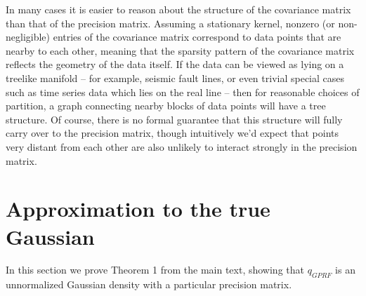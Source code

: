 \documentclass{article}
\begin{document}
In many cases it is easier to reason about the structure of the covariance matrix than that of the precision matrix. Assuming a stationary kernel, nonzero (or non-negligible) entries of the covariance matrix correspond to data points that are nearby to each other, meaning that the sparsity pattern of the covariance matrix reflects the geometry of the data itself. If the data can be viewed as lying on a treelike manifold -- for example, seismic fault lines, or even trivial special cases such as time series data which lies on the real line -- then for reasonable choices of partition, a graph connecting nearby blocks of data points will have a tree structure. Of course, there is no formal guarantee that this structure will fully carry over to the precision matrix, though intuitively we'd expect that points very distant from each other are also unlikely to interact strongly in the precision matrix. 

\section{Approximation to the true Gaussian}
\label{sec:approx-gaussian}

In this section we prove Theorem 1 from the main text, showing that $q_{GPRF}$ is an unnormalized Gaussian density with a particular precision matrix. 
\end{document}
